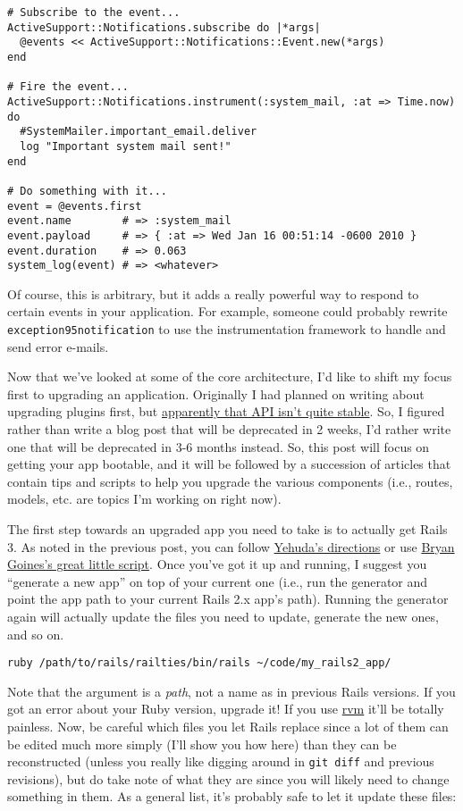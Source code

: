 \documentclass{book}
\begin{document}
\begin{verbatim}# Subscribe to the event...
ActiveSupport::Notifications.subscribe do |*args|
  @events << ActiveSupport::Notifications::Event.new(*args)
end

# Fire the event...
ActiveSupport::Notifications.instrument(:system_mail, :at => Time.now) do
  #SystemMailer.important_email.deliver
  log "Important system mail sent!"
end

# Do something with it...
event = @events.first
event.name        # => :system_mail
event.payload     # => { :at => Wed Jan 16 00:51:14 -0600 2010 }
event.duration    # => 0.063
system_log(event) # => <whatever>\end{verbatim}
Of course, this is arbitrary, but it adds a really powerful way to respond to certain events in your application. For example, someone could probably rewrite {\colorbox[rgb]{0.87,0.87,0.87}{\tt exception\char95notification}} to use the instrumentation framework to handle and send error e-mails.

Now that we'{}ve looked at some of the core architecture, I'{}d like to shift my focus first to upgrading an application. Originally I had planned on writing about upgrading plugins first, but \href{http://groups.google.com/group/rubyonrails-core/browse_thread/thread/00d8f6f406b96031#}{apparently that API isn'{}t quite stable}. So, I figured rather than write a blog post that will be deprecated in 2 weeks, I'{}d rather write one that will be deprecated in 3-6 months instead. So, this post will focus on getting your app bootable, and it will be followed by a succession of articles that contain tips and scripts to help you upgrade the various components (i.e., routes, models, etc. are topics I'{}m working on right now).

The first step towards an upgraded app you need to take is to actually get Rails 3. As noted in the previous post, you can follow \href{http://yehudakatz.com/2009/12/31/spinning-up-a-new-rails-app/}{Yehuda'{}s directions} or use \href{http://github.com/bry4n/rails3-install}{Bryan Goines'{}s great little script}. Once you'{}ve got it up and running, I suggest you ``{}generate a new app''{} on top of your current one (i.e., run the generator and point the app path to your current Rails 2.x app'{}s path). Running the generator again will actually update the files you need to update, generate the new ones, and so on.

\begin{verbatim}ruby /path/to/rails/railties/bin/rails ~/code/my_rails2_app/\end{verbatim}
Note that the argument is a \emph{path}, not a name as in previous Rails versions. If you got an error about your Ruby version, upgrade it! If you use \href{http://rvm.beginrescueend.com/}{rvm} it'{}ll be totally painless. Now, be careful which files you let Rails replace since a lot of them can be edited much more simply (I'{}ll show you how here) than they can be reconstructed (unless you really like digging around in {\colorbox[rgb]{0.87,0.87,0.87}{\tt git~diff}} and previous revisions), but do take note of what they are since you will likely need to change something in them. As a general list, it'{}s probably safe to let it update these files:
\end{document}
